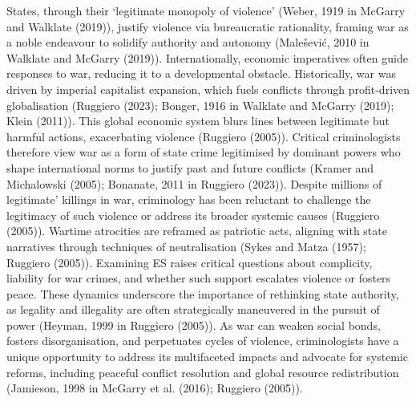 \documentclass[
]{article}
\begin{document}
States, through their `legitimate monopoly of violence' (Weber, 1919 in
McGarry and Walklate (2019)), justify violence via bureaucratic
rationality, framing war as a noble endeavour to solidify authority and
autonomy (Malešević, 2010 in Walklate and McGarry (2019)).
Internationally, economic imperatives often guide responses to war,
reducing it to a developmental obstacle. Historically, war was driven by
imperial capitalist expansion, which fuels conflicts through
profit-driven globalisation (Ruggiero (2023); Bonger, 1916 in Walklate
and McGarry (2019); Klein (2011)). This global economic system blurs
lines between legitimate but harmful actions, exacerbating violence
(Ruggiero (2005)). Critical criminologists therefore view war as a form
of state crime legitimised by dominant powers who shape international
norms to justify past and future conflicts (Kramer and Michalowski
(2005); Bonanate, 2011 in Ruggiero (2023)). Despite millions of
legitimate' killings in war, criminology has been reluctant to challenge
the legitimacy of such violence or address its broader systemic causes
(Ruggiero (2005)). Wartime atrocities are reframed as patriotic acts,
aligning with state narratives through techniques of neutralisation
(Sykes and Matza (1957); Ruggiero (2005)). Examining ES raises critical
questions about complicity, liability for war crimes, and whether such
support escalates violence or fosters peace. These dynamics underscore
the importance of rethinking state authority, as legality and illegality
are often strategically maneuvered in the pursuit of power (Heyman, 1999
in Ruggiero (2005)). As war can weaken social bonds, fosters
disorganisation, and perpetuates cycles of violence, criminologists have
a unique opportunity to address its multifaceted impacts and advocate
for systemic reforms, including peaceful conflict resolution and global
resource redistribution (Jamieson, 1998 in McGarry et al. (2016);
Ruggiero (2005)).
\end{document}
